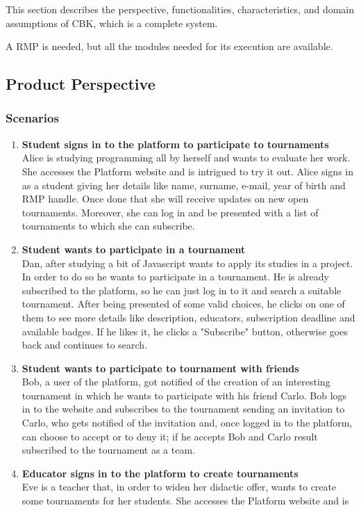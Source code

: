 This section describes the perspective, functionalities, characteristics, and domain assumptions of CBK, which is a complete system.

A RMP is needed, but all the modules needed for its execution are available.
\\
\subsection{Product Perspective}
\subsubsection{Scenarios}
\begin{enumerate}[label=$\bullet$ \textbf{SC\arabic*:}]
    \item \textbf{Student signs in to the platform to participate to tournaments}\\ Alice is studying programming all by herself and wants to evaluate her work. She accesses the Platform website and is intrigued to try it out. 
    Alice signs in as a student giving her details like name, surname, e-mail,  year of birth and RMP handle. Once done that she will receive updates on new open tournaments. Moreover, she can log in and be presented with a list 
    of tournaments to which she can subscribe.
    \item \textbf{Student wants to participate in a tournament}\\ Dan, after studying a bit of Javascript wants to apply its studies in a project. In order to do so he wants to participate in a tournament. He is already subscribed 
    to the platform, so he can just log in to it and search a suitable tournament. After being presented of some valid choices, he clicks on one of them to see more details like description, educators, subscription deadline and 
    available badges. If he likes it, he clicks a "Subscribe" button, otherwise goes back and continues to search.
    \item \textbf{Student wants to participate to tournament with friends}\\ Bob, a user of the platform, got notified of the creation of an interesting tournament in which he wants to participate with his friend Carlo. Bob logs in 
    to the website and subscribes to the tournament sending an invitation to Carlo, who gets notified of the invitation and, once logged in to the platform, can choose to accept or to deny it; if he accepts Bob and Carlo result 
    subscribed to the tournament as a team.
    \item \textbf{Educator signs in to the platform to create tournaments}\\ Eve is a teacher that, in order to widen her didactic offer, wants to create some tournaments for her students. She accesses the Platform website and is 

\end{enumerate}
